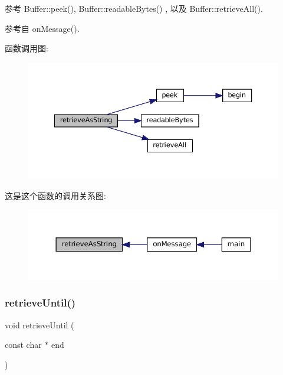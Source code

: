 参考 Buffer\+::peek(), Buffer\+::readable\+Bytes() , 以及 Buffer\+::retrieve\+All().



参考自 on\+Message().

函数调用图\+:
\nopagebreak
\begin{figure}[H]
\begin{center}
\leavevmode
\includegraphics[width=350pt]{classmuduo_1_1Buffer_a49c703048227a7c666fca7514b60892e_cgraph}
\end{center}
\end{figure}
这是这个函数的调用关系图\+:
\nopagebreak
\begin{figure}[H]
\begin{center}
\leavevmode
\includegraphics[width=350pt]{classmuduo_1_1Buffer_a49c703048227a7c666fca7514b60892e_icgraph}
\end{center}
\end{figure}
\mbox{\label{classmuduo_1_1Buffer_abffa19bdb1fbf4ac36fe0f2375bee1e5}} 
\subsubsection{\texorpdfstring{retrieve\+Until()}{retrieveUntil()}}
{\footnotesize\ttfamily void retrieve\+Until (\begin{DoxyParamCaption}\item[{const char $\ast$}]{end }\end{DoxyParamCaption})\hspace{0.3cm}{\ttfamily [inline]}}



